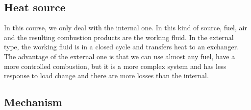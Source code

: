 	\subsection{Heat source}
		In this course, we only deal with the internal one. In this kind of source, fuel, air and the resulting combustion products are the working fluid. In the external type, the working fluid is in a closed cycle and transfers heat to an exchanger. The advantage of the external one is that we can use almost any fuel, have a more controlled combustion, but it is a more complex system and has less response to load change and there are more losses than the internal.   
		
	\subsection{Mechanism}
		
